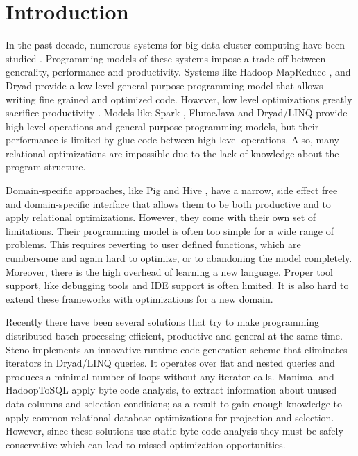 \section{Introduction}
\label{sec:introduction}

In the past decade, numerous systems for big data cluster computing have been
studied \cite{dean_mapreduce:_2008, yu_dryadlinq:_2008-1, olston_pig_2008-1,
thusoo_hive_2010-1, spark-nsdi}. Programming models of these systems impose a
trade-off between generality, performance and productivity. Systems like Hadoop
MapReduce \cite{hadoop}, and Dryad \cite{isard_dryad:_2007} provide a low level
general purpose programming model that allows writing fine grained and optimized
code. However, low level optimizations greatly sacrifice productivity
\cite{chambers_flumejava:_2010}. Models like Spark \cite{spark-nsdi}, FlumeJava
\cite{chambers_flumejava:_2010} and Dryad/LINQ \cite{yu_dryadlinq:_2008-1}
provide high level operations and general purpose programming models, but their
performance is limited by glue code between high level operations. Also, many
relational optimizations are impossible due to the lack of knowledge about the
program structure.

Domain-specific approaches, like Pig \cite{olston_pig_2008-1} and Hive
\cite{thusoo_hive_2010-1}, have a narrow, side effect free and
domain-specific interface that allows them to be both productive and to apply relational optimizations.
However, they come with their own set of limitations. Their programming model is
often too simple for a wide range of problems. This requires reverting to user
defined functions, which are cumbersome and again hard to optimize, or to
abandoning the model completely. Moreover, there is the high overhead of
learning a new language.
Proper tool support, like debugging tools and IDE support is often limited. It
is also hard to extend these frameworks with optimizations for a new domain.

Recently there have been several solutions that try to make programming
distributed batch processing efficient, productive and general at the same time.
Steno \cite{murray_steno:_2011} implements an innovative runtime code generation
scheme that eliminates iterators in Dryad/LINQ queries. It operates over flat
and nested queries and produces a minimal number of loops without any iterator
calls. Manimal \cite{jahani_automatic_2011} and HadoopToSQL
\cite{iu_hadooptosql:_2010} apply byte code analysis, to extract information
about unused data columns and selection conditions; as a result to gain enough
knowledge to apply common relational database optimizations for projection and
selection. However, since these solutions use static byte code analysis they
must be safely conservative which can lead to missed optimization opportunities.

